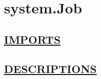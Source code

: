 \chapter*{system.Job}
\hypertarget{ecldoc:toc:system.Job}{}

\section*{\underline{IMPORTS}}

\section*{\underline{DESCRIPTIONS}}
